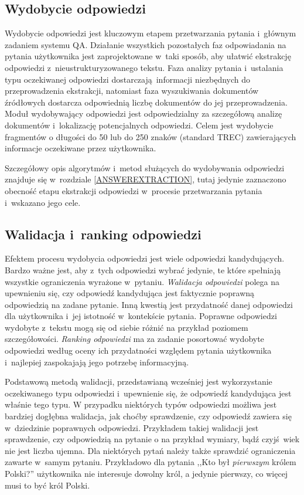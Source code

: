 \documentclass[a4paper, twoside, 12pt]{report}
\begin{document}
        \subsection{Wydobycie odpowiedzi}
            Wydobycie odpowiedzi jest kluczowym etapem przetwarzania pytania i~głównym zadaniem systemu QA. Działanie
            wszystkich pozostałych faz odpowiadania na pytania użytkownika jest zaprojektowane w~taki sposób, aby
            ułatwić ekstrakcję odpowiedzi z~nieustrukturyzowanego tekstu. Faza analizy pytania i~ustalania typu oczekiwanej
            odpowiedzi dostarczają informacji niezbędnych do przeprowadzenia ekstrakcji, natomiast faza wyszukiwania
            dokumentów źródłowych dostarcza odpowiednią liczbę dokumentów do jej przeprowadzenia. Moduł wydobywający
            odpowiedzi jest odpowiedzialny za szczegółową analizę dokumentów i~lokalizację potencjalnych odpowiedzi.
            Celem jest wydobycie fragmentów o długości do 50 lub do 250 znaków (standard TREC) zawierających informacje
            oczekiwane przez użytkownika.

            Szczegółowy opis algorytmów i~metod służących do wydobywania odpowiedzi znajduje się w~rozdziale
            \ref{ANSWEREXTRACTION}, tutaj jedynie zaznaczono obecność etapu ekstrakcji odpowiedzi w~procesie przetwarzania
            pytania i~wskazano jego cele.

        \subsection{Walidacja i~ranking odpowiedzi}
            Efektem procesu wydobycia odpowiedzi jest wiele odpowiedzi kandydujących. Bardzo ważne jest, aby z~tych
            odpowiedzi wybrać jedynie, te które spełniają wszystkie ograniczenia wyrażone w~pytaniu. \emph{Walidacja odpowiedzi}
            polega na upewnieniu się, czy odpowiedź kandydująca jest faktycznie poprawną odpowiedzią na zadane pytanie.
            Inną kwestią jest przydatność danej odpowiedzi dla użytkownika i~jej istotność w~kontekście pytania.
            Poprawne odpowiedzi wydobyte z~tekstu mogą się od siebie różnić na przykład poziomem szczegółowości.
            \emph{Ranking odpowiedzi} ma za zadanie posortować wydobyte odpowiedzi według oceny ich przydatności
            względem pytania użytkownika i~najlepiej zaspokajają jego potrzebę informacyjną.

             Podstawową metodą walidacji, przedstawianą wcześniej jest wykorzystanie
            oczekiwanego typu odpowiedzi i~upewnienie się, że odpowiedź kandydująca jest właśnie tego typu. W przypadku
            niektórych typów odpowiedzi możliwa jest bardziej dogłębna walidacja, jak choćby sprawdzenie, czy odpowiedź
            zawiera się w~dziedzinie poprawnych odpowiedzi. Przykładem takiej walidacji jest sprawdzenie, czy odpowiedzią
            na pytanie o na przykład wymiary, bądź czyjś wiek nie jest liczba ujemna. Dla niektórych pytań należy
            także sprawdzić ograniczenia zawarte w~samym pytaniu. Przykładowo dla pytania ,,Kto był \emph{pierwszym} królem
            Polski?'' użytkownika nie interesuje dowolny król, a jedynie pierwszy, co więcej musi to być król Polski.
\end{document}
